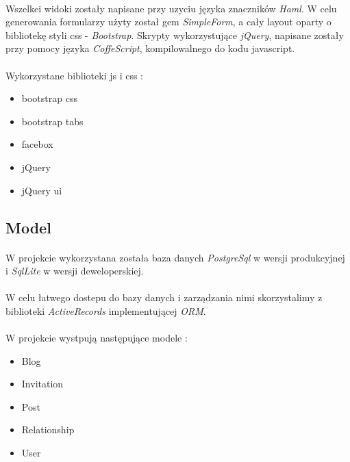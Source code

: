 \documentclass[wide,a4paper,titlepage,12pt] {article}
\begin{document}
    \paragraph{}
    Wszelkei widoki zostały napisane przy uzyciu języka znaczników \textit{Haml}. W celu generowania formularzy użyty został gem \textit{SimpleForm}, a cały layout oparty o bibliotekę styli css - \textit{Bootstrap}. Skrypty wykorzystujące \textit{jQuery}, napisane zostały przy pomocy języka \textit{CoffeScript}, kompilowalnego do kodu javascript.

    \paragraph{}
    Wykorzystane biblioteki js i css :
    \begin{itemize}
      \item bootstrap css
      \item bootstrap tabs
      \item facebox
      \item jQuery
      \item jQuery ui
    \end{itemize}
    
    \subsection{Model}
    \paragraph{}
    W projekcie wykorzystana została baza danych \textit{PostgreSql} w wersji produkcyjnej i \textit{SqlLite} w wersji deweloperskiej.

    \paragraph{}
    W celu łatwego dostepu do bazy danych i zarządzania nimi skorzystalimy z biblioteki \textit{ActiveRecords} implementującej \textit{ORM}.

    \paragraph{}
    W projekcie wystpują następujące modele :
    \begin{itemize}
      \item Blog
      \item Invitation
      \item Post
      \item Relationship
      \item User
    \end{itemize}
\end{document}
